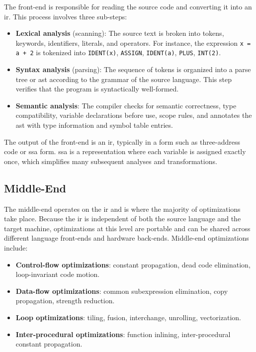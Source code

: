 The front-end is responsible for reading the source code and converting it into an \gls{ir}. This process involves three sub-steps:

\begin{itemize}
    \item \textbf{Lexical analysis} (scanning): The source text is broken into tokens, keywords, identifiers, literals, and operators. For instance, the expression \texttt{x = a + 2} is tokenized into \texttt{IDENT(x)}, \texttt{ASSIGN}, \texttt{IDENT(a)}, \texttt{PLUS}, \texttt{INT(2)}.
    \item \textbf{Syntax analysis} (parsing): The sequence of tokens is organized into a parse tree or \gls{ast} according to the grammar of the source language. This step verifies that the program is syntactically well-formed.
    \item \textbf{Semantic analysis}: The compiler checks for semantic correctness, type compatibility, variable declarations before use, scope rules, and annotates the \gls{ast} with type information and symbol table entries.
\end{itemize}

The output of the front-end is an \gls{ir}, typically in a form such as three-address code or \gls{ssa} form. \gls{ssa} is a representation where each variable is assigned exactly once, which simplifies many subsequent analyses and transformations.

\subsection{Middle-End}

The middle-end operates on the \gls{ir} and is where the majority of optimizations take place. Because the \gls{ir} is independent of both the source language and the target machine, optimizations at this level are portable and can be shared across different language front-ends and hardware back-ends. Middle-end optimizations include:

\begin{itemize}
    \item \textbf{Control-flow optimizations}: constant propagation, dead code elimination, loop-invariant code motion.
    \item \textbf{Data-flow optimizations}: common subexpression elimination, copy propagation, strength reduction.
    \item \textbf{Loop optimizations}: tiling, fusion, interchange, unrolling, vectorization.
    \item \textbf{Inter-procedural optimizations}: function inlining, inter-procedural constant propagation.
\end{itemize}

